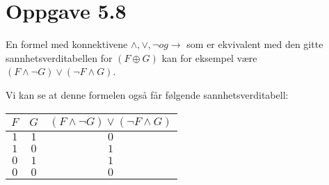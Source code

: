 \documentclass[12pt,norsk,a4paper]{article}
\begin{document}
\section*{Oppgave 5.8}
En formel med konnektivene $\land, \lor, \neg og \rightarrow$ som er ekvivalent med den gitte sannhetsverditabellen for $(F \oplus G)$ kan for eksempel være $(F \land \neg G) \lor (\neg F \land G)$.

Vi kan se at denne formelen også får følgende sannhetsverditabell:

\begin{tabular}{c|c|c}
  $F$ & $G$ & $(F \land \neg G) \lor (\neg F \land G)$ \\
  \hline
  $1$ & $1$ & $0$ \\
  $1$ & $0$ & $1$ \\
  $0$ & $1$ & $1$ \\
  $0$ & $0$ & $0$ \\
\end{tabular}


\end{document}
